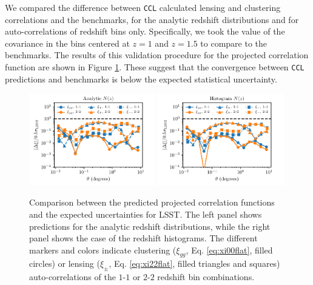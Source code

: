 \documentclass[\docopts]{\docclass}
\newcommand{\ccl}{{\tt CCL}\xspace}
\begin{document}
We compared the difference between \ccl calculated lensing and clustering correlations and the benchmarks, for the analytic redshift distributions and for auto-correlations of redshift bins only. Specifically, we took the value of the covariance in the bins centered at $z=1$ and $z=1.5$ to compare to the benchmarks. The results of this validation procedure for the projected correlation function are shown in Figure \ref{fig:corrval}. These suggest that the convergence between \ccl predictions and benchmarks is below the expected statistical uncertainty. 

\begin{figure}
\centering
\includegraphics[width=0.49\textwidth]{projected_correlation_error_comparison_analytic} 
\includegraphics[width=0.49\textwidth]{projected_correlation_error_comparison_histo} 
\caption{Comparison between the predicted projected correlation functions and the expected uncertainties for LSST. The left panel shows predictions for the analytic redshift distributions, while the right panel shows the case of the redshift histograms. The different markers and colors indicate clustering ($\xi_{gg}$, Eq. \ref{eq:xi00flat}, filled circles) or lensing ($\xi_{\pm}$, Eq. \ref{eq:xi22flat}, filled triangles and squares) auto-correlations of the $1$-$1$ or $2$-$2$ redshift bin combinations.}
\label{fig:corrval}
\end{figure}
\end{document}
